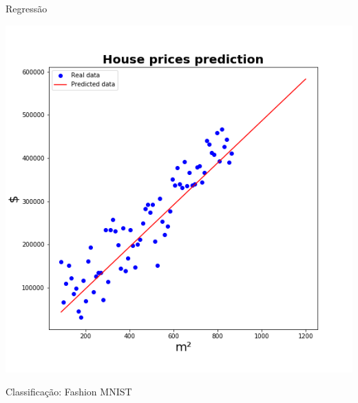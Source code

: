 \documentclass[10pt]{beamer}
\begin{document}
\begin{frame}{Regressão}
\begin{center}
\includegraphics[scale=0.40]{images/house_prices2.png}
\end{center}
\end{frame}


\begin{frame}{Classificação: Fashion MNIST \cite{xiao2017/online}}

\end{frame}
\end{document}
